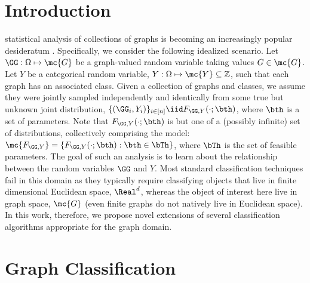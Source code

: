 \documentclass[10pt,journal,cspaper,compsoc]{IEEEtran}
\begin{document}
\maketitle
\IEEEdisplaynotcompsoctitleabstractindextext
\IEEEpeerreviewmaketitle



\section{Introduction}

 statistical analysis of collections of graphs is becoming an increasingly popular desideratum \cite{Bunke2011}.  Specifically, we consider the following idealized scenario. Let $\GG: \Omega \mapsto \mc{G}$ be a graph-valued random variable taking values $G\in \mc{G}$.  Let $Y$ be a categorical random variable, $Y: \Omega \mapsto \mc{Y} \subseteq \mathbb{Z}$, such that each graph has an associated class.  Given a collection of graphs and classes,  we assume they were jointly sampled independently and identically from some true but unknown joint distribution, $\{(\GG_i,Y_i)\}_{i \in [n]} \iid F_{\GG,Y}(\cdot; \bth)$, where $\bth$ is a set of parameters.  Note that $F_{\GG,Y}(\cdot; \bth)$ is but one of a (possibly infinite) set of distributions, collectively comprising the model: $\mc{F_{\GG,Y}}=\{F_{\GG,Y}(\cdot; \bth) : \bth \in \bTh\}$, where $\bTh$ is the set of feasible parameters.  The goal of such an analysis is to learn about the relationship between the random variables $\GG$ and $Y$.   Most standard classification techniques fail in this domain as they typically require classifying objects that live in finite dimensional Euclidean space, $\Real^d$, whereas the object of interest here live in graph space, $\mc{G}$ (even finite graphs do not natively live in Euclidean space).  In this work, therefore, we propose novel extensions of several classification algorithms appropriate for the graph domain.



\section{Graph Classification} %
\label{sec:graph_classification}
\end{document}
